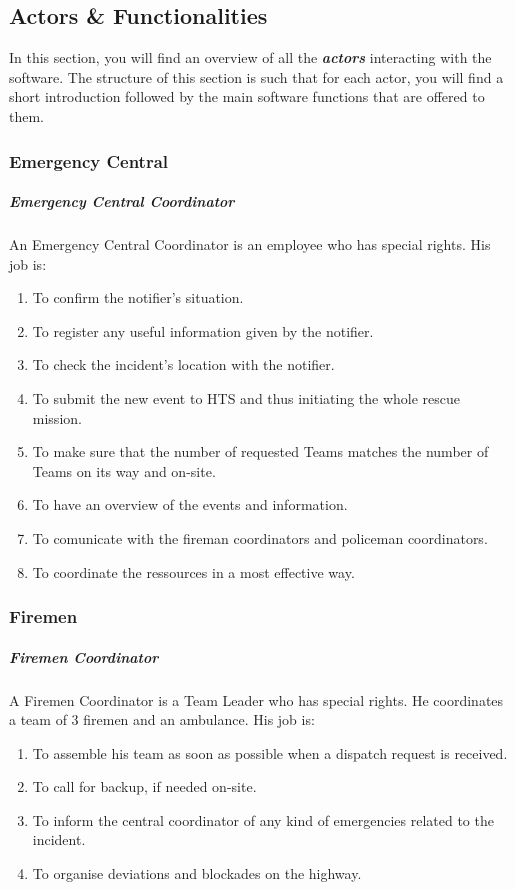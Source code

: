 \subsection{Actors \& Functionalities}
In this section, you will find an overview of all the
\textbf{\emph{\glspl{actor}}} interacting with the software. The structure of
this section is such that for each actor, you will find a short introduction
followed by the main software functions that are offered to them.

\subsubsection{Emergency Central}

\subparagraph{Emergency Central Coordinator}
An Emergency Central Coordinator is an employee who has special rights. 
His job is:

\begin{enumerate}
\item To confirm the notifier's situation.
\item To register any useful information given by the notifier.
\item To check the incident's location with the notifier.
\item To submit the new event to HTS and thus initiating the whole rescue
mission.
\item To make sure that the number of requested Teams matches the number of
Teams on its way and on-site.
\item To have an overview of the events and information.
\item To comunicate with the fireman coordinators and policeman coordinators.
\item To coordinate the ressources in a most effective way.
\end{enumerate}



\subsubsection{Firemen}

\subparagraph{Firemen Coordinator}
A Firemen Coordinator is a Team Leader who has special
rights. He coordinates a team of 3 firemen and an ambulance.
His job is:

\begin{enumerate}
\item To assemble his team as soon as possible when a dispatch request is
received.
\item To call for backup, if needed on-site.
\item To inform the central coordinator of any kind of
emergencies related to the incident.
\item To organise deviations and blockades on the highway.
\end{enumerate}

